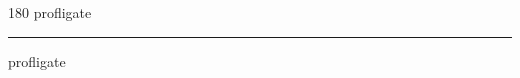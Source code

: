 
\begin{frame}
\begin{center}
\begin{turn}{180}
{\fontsize{2.5cm}{1em}\selectfont profligate}
\end{turn}
\vspace{1em}\par  
\hrule
\vspace{1em}\par  
{\fontsize{2.5cm}{1em}\selectfont profligate}
\end{center}
\end{frame}
